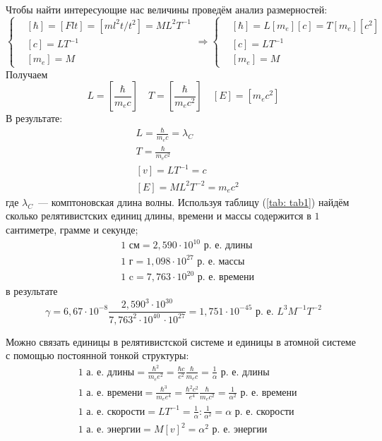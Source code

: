 \documentclass[a4paper,14pt]{extarticle} %
\begin{document}
	Чтобы найти интересующие нас величины проведём анализ размерностей:
	\begin{equation*}
	\left\{
	\begin{split}
		& [\hbar] = [Flt] = [ml^2t/t^2] = ML^2T^{-1} \\
		& [c] = LT^{-1} \\
		& [m_e] = M
	\end{split}
	\right.
	\Rightarrow
	\left\{
	\begin{split}
		& [\hbar] = L[m_e][c] = T [m_e][c^2] \\
		& [c] = LT^{-1} \\
		& [m_e] = M
	\end{split}
	\right.	
	\end{equation*}
	Получаем
	\begin{equation*}
		L = \left[\frac{\hbar}{m_ec}\right] \quad
		T = \left[\frac{\hbar}{m_ec^2}\right] \quad
		[E] = [m_e c^2]
	\end{equation*}	
	В результате:
	\begin{equation*}
	{
	\begin{split}
		& L = \frac{\hbar}{m_ec}=\lambda_C \\
		& T = \frac{\hbar}{m_ec^2} \\
		& [v] = LT^{-1} = c \\
		& [E] = ML^2T^{-2} = m_e c^2
	\end{split}
	}
	\end{equation*}	
	где \(\lambda_C\)~--- комптоновская длина волны.
	Используя таблицу (\ref{tab: tab1}) найдём сколько релятивистских единиц длины, времени и массы содержится в \(1\) сантиметре, грамме и секунде;
	{
	\begin{equation*}
	\begin{split}
	& 1\text{~см} =
		2,590\cdot10^{10} \text{~р.~е.~длины} \\
	& 1\text{~г} =  
		1,098\cdot10^{27} \text{~р.~е.~массы} \\
	& 1\text{~c} =  
		7,763\cdot10^{20} \text{~р.~е.~времени}		
	\end{split}
	\end{equation*}
	}	
	в результате 
	\[
	\gamma = 
	6,67\cdot10^{-8} \frac{2,590^3\cdot10^{30}}{7,763^2\cdot10^{40}\, \cdot10^{27}} = 1,751\cdot10^{-45}  \text{~р.~е.~}L^3M^{-1}T^{-2}
	\]	
	
	Можно связать единицы в релятивистской системе и единицы в атомной системе с помощью постоянной тонкой структуры:
	\begin{equation*}
	{
	\begin{split}
	& \text{1~а.~е.~длины} = \frac{\hbar^2}{m_e e^2} = \frac{\hbar c}{e^2} \frac{\hbar}{m_e c} = \frac{1}{\alpha} \text{~р.~е.~длины} \\
	& \text{1~а.~е.~времени} = \frac{\hbar^3}{m_e e^4} = \frac{\hbar^2 c^2}{e^4}  \frac{\hbar}{m_ec^2} = \frac{1}{\alpha^2} \text{~р.~е.~времени} \\
	& \text{1~а.~е.~скорости} = LT^{-1} = \frac{1}{\alpha} \colon \frac{1}{\alpha^2} = \alpha \text{~р.~е.~скорости} \\
	& \text{1~а.~е.~энергии} = M[v]^2 = \alpha^2 \text{~р.~е.~энергии}
	\end{split}
	}
	\end{equation*}
\end{document}
